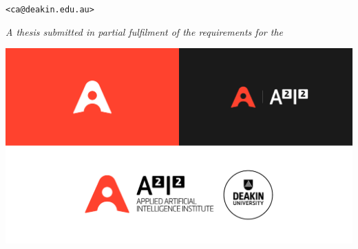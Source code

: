 \vspace*{\fill}
\thispagestyle{empty}

\centering

\Large
\textbf{\themaintitle}
\vspace{0.9 cm}


\theauthor{}\\
\normalsize \theauthorspostnominals{}\\
\texttt{<ca@deakin.edu.au>}
\vspace{0.75 cm}

%
\itshape
A thesis submitted in partial fulfilment of the requirements for the\\
\upshape
\thedegree

\vspace{2 cm}
\includegraphics[width=.8\linewidth]{frontmatter/figures/a2i2}
\vspace{2 cm}

\upshape\large
\thedepartment{}\\
\theinstitution{}\\
\thelocation

\vspace{1cm}
\thedate{}
\vspace*{\fill}

\justify
\normalsize
\restoregeometry